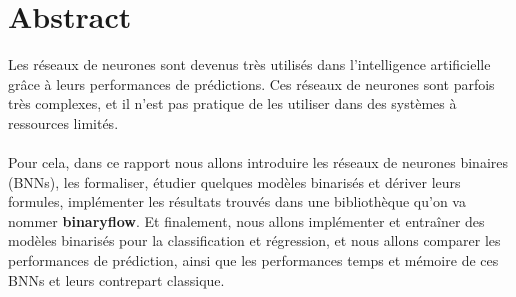 \chapter*{Abstract}
Les réseaux de neurones sont devenus très utilisés dans l'intelligence artificielle grâce à leurs performances de prédictions.
\newline Ces réseaux de neurones sont parfois très complexes, et il n'est pas pratique de les utiliser dans des systèmes à ressources limités.\\
\\ 
Pour cela, dans ce rapport nous allons introduire les réseaux de neurones binaires (BNNs), les formaliser, étudier quelques modèles binarisés et dériver leurs formules, implémenter les résultats trouvés dans une bibliothèque qu'on va nommer \textbf{binaryflow}. 
\newline Et finalement, nous allons implémenter et entraîner des modèles binarisés pour la classification et régression, et nous allons comparer les performances de prédiction, ainsi que les performances temps et mémoire de ces BNNs et leurs contrepart classique. 
